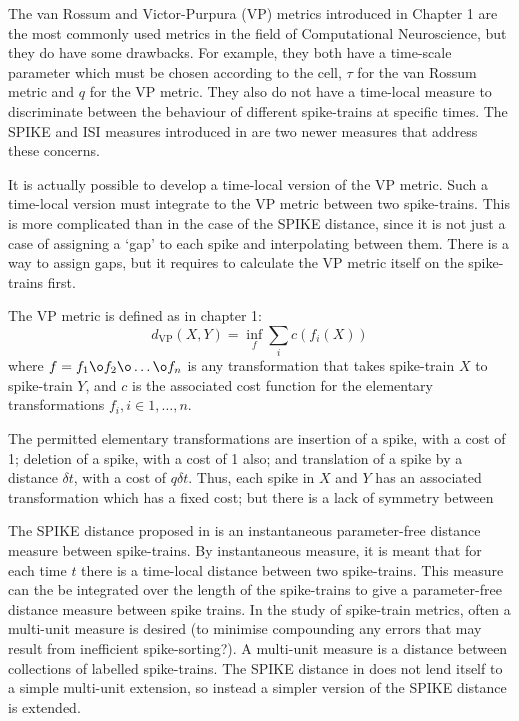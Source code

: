 The van Rossum \cite{VanRossum2001a} and Victor-Purpura \cite{VictorPurpura1996a} (VP) metrics introduced in Chapter 1 are the most commonly used metrics in the field of Computational Neuroscience, but they do have some drawbacks.  For example, they both have a time-scale parameter which must be chosen according to the cell, $\tau$ for the van Rossum metric and $q$ for the VP metric.  They also do not have a time-local measure to discriminate between the behaviour of different spike-trains at specific times.  The SPIKE and ISI measures introduced in \cite{KreuzEtAl2007a, KreuzEtAl2011a} are two newer measures that address these concerns.

It is actually possible to develop a time-local version of the VP metric.  Such a time-local version must integrate to the VP metric between two spike-trains.  This is more complicated than in the case of the SPIKE distance, since it is not just a case of assigning a `gap' to each spike and interpolating between them.  There is a way to assign gaps, but it requires to calculate the VP metric itself on the spike-trains first.  

The VP metric is defined as in chapter 1:
\begin{equation}
d_{\text{VP}}(X,Y) = \inf_f \sum_i c(f_i(X))
\end{equation}
where $f = f_1\o f_2\o \ldots \o f_n$ is any transformation that takes spike-train $X$ to spike-train $Y$, and $c$ is the associated cost function for the elementary transformations $f_i, i\in 1,\ldots,n$.

The permitted elementary transformations are insertion of a spike, with a cost of 1; deletion of a spike, with a cost of 1 also; and translation of a spike by a distance $\delta t$, with a cost of $q\delta t$.  Thus, each spike in $X$ and $Y$ has an associated transformation which has a fixed cost; but there is a lack of symmetry between 

The SPIKE distance proposed in \cite{KreuzEtAl2011a} is an instantaneous parameter-free distance measure between spike-trains.  By instantaneous measure, it is meant that for each time $t$ there is a time-local distance between two spike-trains.  This measure can the be integrated over the length of the spike-trains to give a parameter-free distance measure between spike trains. In the study of spike-train metrics, often a multi-unit measure is desired (to minimise compounding any errors that may result from inefficient spike-sorting?). A multi-unit measure is a distance between collections of labelled spike-trains.  The SPIKE distance in \cite{KreuzEtAl2011a} does not lend itself to a simple multi-unit extension, so instead a simpler version of the SPIKE distance is extended.




